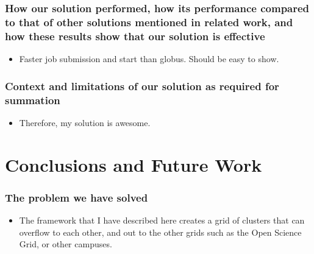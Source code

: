 \documentclass[11pt]{article}
\begin{document}
\subsubsection*{How our solution performed, how its performance compared to
that of other solutions mentioned in related work, and how these results show
that our solution is effective}

\begin{itemize}

\item
Faster job submission and start than globus.  Should be easy to show.

\end{itemize}


\subsubsection*{Context and limitations of our solution as required for 
summation}
\begin{itemize}
\item
Therefore, my solution is awesome.

\end{itemize}



\section{Conclusions and Future Work}
\label{sec:Conclusion}

\subsubsection*{The problem we have solved}
\begin{itemize}


\item
The framework that I have described here creates a grid of clusters that can overflow to each other, and out to the other grids such as the Open Science Grid, or other campuses.  

\end{itemize}
\end{document}
